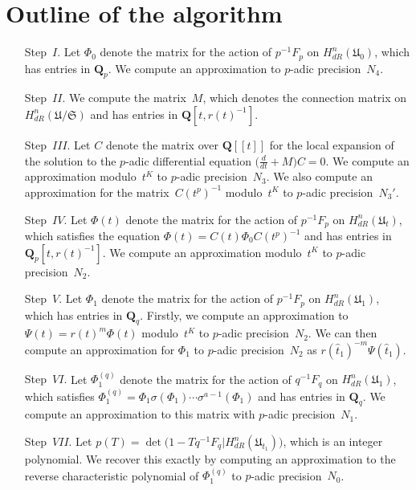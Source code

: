 \section{Outline of the algorithm}

\begin{enumerate}
\item[Step~$I$.]
Let $\Phi_0$ denote the matrix for the action of $p^{-1} F_p$ on 
$H_{dR}^{n}(\mathfrak{U}_0)$, which has entries in $\mathbf{Q}_p$.  
We compute an approximation to $p$-adic precision~$N_4$.
\item[Step~$II$.]
We compute the matrix~$M$, which denotes the connection matrix 
on $H_{dR}^{n}(\mathfrak{U}/\mathfrak{S})$ and has entries in 
$\mathbf{Q}[t,r(t)^{-1}]$.
\item[Step~$III$.]
Let $C$ denote the matrix over $\mathbf{Q}[[t]]$ for the local 
expansion of the solution to the $p$-adic differential equation 
$\bigl(\tfrac{d}{dt} + M\bigr) C = 0$.  We compute an approximation 
modulo~$t^K$ to $p$-adic precision~$N_3$.  We also compute an 
approximation for the matrix~$C(t^p)^{-1}$ modulo~$t^K$ to $p$-adic 
precision~$N_3'$.
\item[Step~$IV$.]
Let $\Phi(t)$ denote the matrix for the action of $p^{-1} F_p$ on 
$H_{dR}^{n}(\mathfrak{U}_t)$, which satisfies the equation 
$\Phi(t) = C(t) \Phi_0 C(t^p)^{-1}$ and has entries in 
$\mathbf{Q}_p[t,r(t)^{-1}]$.  We compute an approximation modulo~$t^K$ 
to $p$-adic precision~$N_2$.
\item[Step~$V$.]
Let $\Phi_1$ denote the matrix for the action of $p^{-1} F_p$ 
on $H_{dR}^{n}(\mathfrak{U}_1)$, which has entries in $\mathbf{Q}_q$. 
Firstly, we compute an approximation to $\Psi(t) = r(t)^m \Phi(t)$ 
modulo~$t^K$ to $p$-adic precision~$N_2$.  We can then compute an 
approximation for $\Phi_1$ to $p$-adic precision~$N_2$ as 
$r(\hat{t}_1)^{-m} \Psi(\hat{t}_1)$.
\item[Step~$VI$.]
Let $\Phi_1^{(q)}$ denote the matrix for the action of $q^{-1} F_q$ on 
$H_{dR}^{n}(\mathfrak{U}_1)$, which satisfies 
$\Phi_1^{(q)} = \Phi_1 \sigma(\Phi_1) \dotsm \sigma^{a-1}(\Phi_1)$ and 
has entries in $\mathbf{Q}_q$.  We compute an approximation to this 
matrix with $p$-adic precision~$N_1$.
\item[Step~$VII$.]
Let $p(T) = \det\bigl(1 - T q^{-1} F_q | H_{dR}^n(\mathfrak{U}_{t_1})\bigr)$, 
which is an integer polynomial.  We recover this exactly by computing 
an approximation to the reverse characteristic polynomial of $\Phi_1^{(q)}$ 
to $p$-adic precision~$N_0$.
\end{enumerate}

